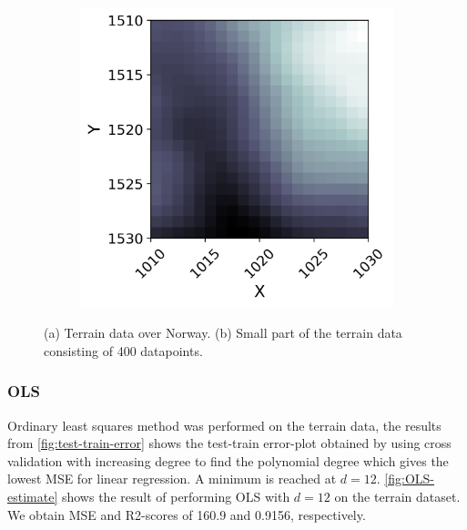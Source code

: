 \documentclass[../main.tex]{subfiles}
\begin{document}
\begin{figure}[H]
\begin{subfigure}[b]{0.55\textwidth}
    \includegraphics[width=\textwidth]{../assets/part_of_terrain.png} 
    \caption{}
    \label{fig:terrain_Norway_patch}
   \end{subfigure}
   \caption{(a) Terrain data over Norway. (b) Small part of the terrain data consisting of 400 datapoints.}
\end{figure} 

\subsubsection{OLS}
Ordinary least squares method was performed on the terrain data, the results from  \autoref{fig:test-train-error} shows the test-train error-plot obtained by using cross validation with increasing degree to find the polynomial degree which gives the lowest MSE for linear regression. A minimum is reached at \ensuremath{d=12}. \autoref{fig:OLS-estimate} shows the result of performing OLS with $d=12$ on the terrain dataset. We obtain MSE and R2-scores of 160.9 and 0.9156, respectively. 
\end{document}
